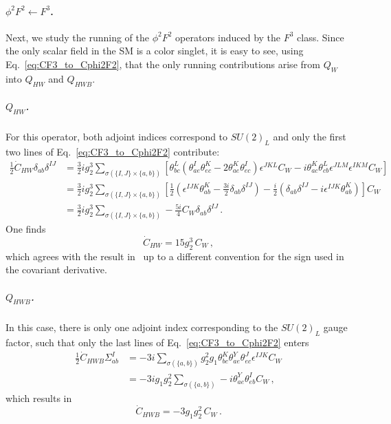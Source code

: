 \paragraph{\texorpdfstring{$\phi^2 F^2 \leftarrow F^3$.}{F3tophi2F2}}

Next, we study the running of the $\phi^2 F^2$ operators induced by the $F^3$ class. 
Since the only scalar field in the SM is a color singlet, it is easy to see, using Eq.~\eqref{eq:CF3_to_Cphi2F2}, that the only running contributions arise from $Q_{W}$ into $Q_{HW}$ and $Q_{HWB}$. 

\subparagraph{\texorpdfstring{$Q_{HW}$.}{Q_HW}} For this operator, both adjoint indices correspond to $SU(2)_L$ and only the first two lines of Eq.~\eqref{eq:CF3_to_Cphi2F2} contribute:
\begin{align}
    \frac{1}{2} \dot{C}_{HW} \delta_{ab} \delta^{IJ} &= \frac{3}{2}i g_2^3 \sum_{\sigma(\{I,J\}\times\{a,b\})} \left[\theta^L_{bc}\left(\theta^I_{ae}\theta^K_{ec}-2\theta^K_{ae}\theta^I_{ec}\right)\epsilon^{JKL} C_{W}-i\theta^K_{ac}\theta^L_{cb}\epsilon^{JLM}\epsilon^{IKM}C_W\right]\nonumber\\
    &= \frac{3}{2}i g_2^3 \sum_{\sigma(\{I,J\}\times\{a,b\})} \left[\frac{1}{2}\left(\epsilon^{IJK}\theta^K_{ab}-\frac{3i}{2}\delta_{ab}\delta^{IJ}\right)-\frac{i}{2}\left(\delta_{ab}\delta^{IJ}-i\epsilon^{IJK}\theta^K_{ab}\right)\right]C_W\nonumber
    \\
    &=\frac{3}{2}i g_2^3 \sum_{\sigma(\{I,J\}\times\{a,b\})} -\frac{5i}{4} C_W\delta_{ab}\delta^{IJ}\,.
    \label{eq:CW_to_CHW}
\end{align}
One finds
\begin{equation}
    \dot{C}_{HW} = 15 g_2^3\, C_W\,,
\end{equation}
which agrees with the result in~\cite{Alonso:2013hga} up to a different convention for the sign used in the covariant derivative. %

\subparagraph{\texorpdfstring{$Q_{HWB}$}{Q_HWB}.} In this case, there is only one adjoint index corresponding to the $SU(2)_L$ gauge factor, such that only the last lines of Eq.~\eqref{eq:CF3_to_Cphi2F2} enters 
\begin{align}
    \frac{1}{2}\dot{C}_{HWB} \Sigma^I_{ab} &= -3i\sum_{\sigma(\{a,b\})} g_2^2 g_1 \theta^K_{bc} \theta^Y_{ae} \theta^J_{ec} \epsilon^{IJK} C_W\nonumber\\
    &= - 3ig_1 g_2^2 \sum_{\sigma(\{a,b\})} -i \theta^Y_{ae} \theta^I_{eb}C_W\,,
\end{align}
which results in
\begin{equation}
    \dot{C}_{HWB} = -3g_1 g_2^2\, C_W\,.
\end{equation}

